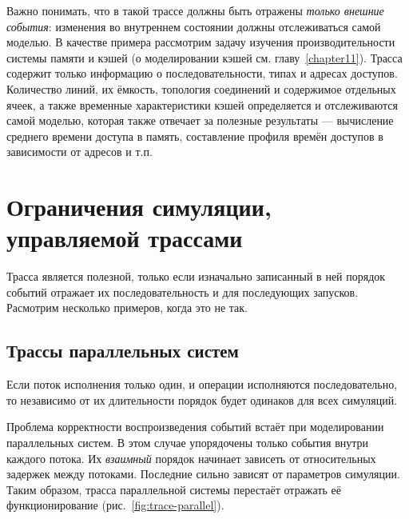 Важно понимать, что в такой трассе должны быть отражены \textit{только внешние события}: изменения во внутреннем состоянии должны отслеживаться самой моделью. В качестве примера рассмотрим задачу изучения производительности системы памяти и кэшей (о моделировании кэшей см. главу~\ref{chapter11}). Трасса содержит только информацию о последовательности, типах и адресах доступов. Количество линий, их ёмкость, топология соединений и содержимое отдельных ячеек, а также временные характеристики кэшей определяется и отслеживаются самой моделью, которая также отвечает за полезные результаты --- вычисление среднего времени доступа в память, составление профиля времён доступов в зависимости от адресов и т.п.


\section[Ограничения трасс]{Ограничения симуляции, управляемой трассами}

Трасса является полезной, только если изначально записанный в ней порядок событий отражает их последовательность и для последующих запусков. Расмотрим несколько примеров, когда это не так.

\subsection{Трассы параллельных систем}

Если поток исполнения только один, и операции исполняются последовательно, то независимо от их длительности порядок будет одинаков для всех симуляций.

Проблема корректности воспроизведения событий встаёт при моделировании параллельных систем. В этом случае упорядочены только события внутри каждого потока. Их \textit{взаимный} порядок начинает зависеть от относительных задержек между потоками. Последние сильно зависят от параметров симуляции. Таким образом, трасса параллельной системы перестаёт отражать её функционирование (рис.~\ref{fig:trace-parallel}).

